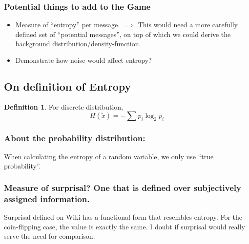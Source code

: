 \documentclass[12pt]{article}
\theoremstyle{definition}
\newtheorem{definition}[theorem]{Definition}
\theoremstyle{plain}
\begin{document}
\subsubsection{ Potential things to add to the Game }
\begin{itemize}
    \item Measure of ``entropy'' per message. $\implies$ This would need a more
        carefully defined set of ``potential messages'', on top of which we
        could derive the background distribution/density-function.
    \item Demonstrate how noise would affect entropy?
\end{itemize}

\subsection{On definition of Entropy}
\begin{definition}
    For discrete distribution,
    \[
        H(\tilde x) = - \sum p_i \log_{2} p_i
    \]
\end{definition}

\subsubsection{About the probability distribution:}
When calculating the entropy of a random variable, we only use ``true
probability''.

\subsubsection{Measure of surprisal? One that is defined over subjectively
assigned information.}
Surprisal defined on Wiki has a functional form that resembles entropy. For the
coin-flipping case, the value is exactly the same. I doubt if surprisal would
really serve the need for comparison.
\end{document}
